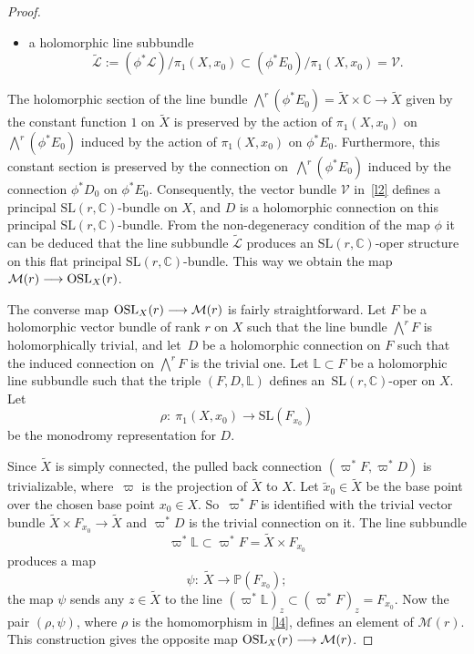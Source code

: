 \documentclass[10pt,a4paper]{amsart}
\numberwithin{equation}{section}
\begin{document}
\begin{proof}
\begin{itemize}
\item a holomorphic line subbundle
\[%
\widetilde{\mathcal L} := (\phi^*{\mathcal L})/\pi_1(X, x_0) \subset
(\phi^*E_0)/\pi_1(X, x_0) = {\mathcal V}.
\]
\end{itemize}
The holomorphic section of the line bundle
$\bigwedge^r (\phi^*E_0) = \widetilde{X}\times{\mathbb C} \longrightarrow
\widetilde{X}$ given by the constant function $1$ on $\widetilde{X}$ is preserved
by the action of $\pi_1(X, x_0)$ on $\bigwedge^r (\phi^*E_0)$ induced by the action of
$\pi_1(X, x_0)$ on $\phi^*E_0$. Furthermore, this constant section is preserved by the
connection on~$\bigwedge^r (\phi^*E_0)$ induced by the connection
$\phi^* D_0$ on $\phi^*E_0$. Consequently, the vector bundle ${\mathcal V}$ in~\eqref{l2} defines a
principal $\text{SL}(r, {\mathbb C})$-bundle on $X$, and $D$ is
a holomorphic connection on this principal $\text{SL}(r, {\mathbb C})$-bundle. From the
non-degeneracy condition of the map $\phi$ it can be deduced that the
line subbundle $\widetilde{\mathcal L}$ produces an $\text{SL}(r, {\mathbb C})$-oper
structure on this flat principal $\text{SL}(r, {\mathbb C})$-bundle. This way we obtain the
map ${\mathcal M}(r) \longrightarrow {\rm OSL}_X(r)$.

{\samepage The converse map ${\rm OSL}_X(r) \longrightarrow {\mathcal M}(r)$ is
fairly straightforward. Let $F$ be a holomorphic vector bundle of rank $r$ on $X$
such that the line bundle $\bigwedge^r F$ is holomorphically trivial, and let~$D$ be
a holomorphic connection on $F$ such that the induced connection on $\bigwedge^r F$
is the trivial one. Let ${\mathbb L} \subset F$ be a holomorphic line subbundle
such that the triple $(F, D, {\mathbb L})$ defines an~$\text{SL}(r, {\mathbb C})$-oper
on $X$. Let
\begin{equation}\label{l4}
\rho\colon\ \pi_1(X, x_0) \longrightarrow \text{SL}(F_{x_0})
\end{equation}
be the monodromy representation for $D$.}

Since $\widetilde X$ is simply connected, the pulled back connection
$(\varpi^*F, \varpi^*D)$ is trivializable, where~$\varpi$ is the projection of
$\widetilde X$ to $X$. Let $\widetilde{x}_0 \in \widetilde X$ be the base point
over the chosen base point $x_0 \in X$. So~$\varpi^*F$ is identified with the
trivial vector bundle ${\widetilde X}\times F_{x_0} \longrightarrow {\widetilde X}$
and $\varpi^*D$ is the trivial connection on it. The line subbundle
\[
\varpi^* {\mathbb L} \subset \varpi^* F = {\widetilde X}\times F_{x_0}
\]
produces a map
\[
\psi\colon\ {\widetilde X} \longrightarrow {\mathbb P}(F_{x_0});
\]
the map $\psi$ sends any $z \in {\widetilde X}$ to the line
$(\varpi^* {\mathbb L})_z \subset (\varpi^* F)_z = F_{x_0}$. Now the
pair $(\rho, \psi)$, where $\rho$ is the homomorphism in \eqref{l4}, defines an element of ${\mathcal M}(r)$.
This construction gives the opposite map ${\rm OSL}_X(r) \longrightarrow {\mathcal M}(r)$.


\end{proof}
\end{document}
